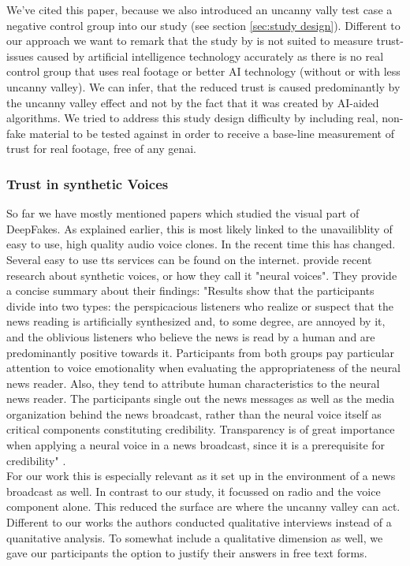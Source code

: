 \documentclass[
  a4paper,  %
  twoside,  %
  bibliography=totoc,
  headsepline,
  cleardoublepage=empty,
  parskip=half,
  draft=false
]{scrbook}
\begin{document}
We've cited this paper, because we also introduced an uncanny vally test case a negative control group into our study (see section \ref{sec:study design}). Different to our approach we want to remark that the study by  is not suited to measure trust-issues caused by artificial intelligence technology accurately as there is no real control group that uses real footage or better AI technology (without or with less uncanny valley). We can infer, that the reduced trust is caused predominantly by the uncanny valley effect and not by the fact that it was created by AI-aided algorithms. We tried to address this study design difficulty by including real, non-fake material to be tested against in order to receive a base-line measurement of trust for real footage, free of any \gls{genai}.

\subsubsection*{Trust in synthetic Voices}
So far we have mostly mentioned papers which studied the visual part of DeepFakes. As explained earlier, this is most likely linked to the unavailiblity of easy to use, high quality audio voice clones. In the recent time this has changed. Several easy to use \gls{tts} services can be found on the internet.  provide recent research about synthetic voices, or how they call it "neural voices". They provide a concise summary about their findings: "Results show that the participants divide into two types: the perspicacious listeners who realize or suspect that the news reading is artificially synthesized and, to some degree, are annoyed by it, and the oblivious listeners who believe the news is read by a human and are predominantly positive towards it. Participants from both groups pay particular attention to voice emotionality when evaluating the appropriateness of the neural news reader. Also, they tend to attribute human characteristics to the neural news reader. The participants single out the news messages as well as the media organization behind the news broadcast, rather than the neural voice itself as critical components constituting credibility. Transparency is of great importance when applying a neural voice in a news broadcast, since it is a prerequisite for credibility" \cite{heiselbergAutomatedNewsReading2022}. \\
For our work this is especially relevant as it set up in the environment of a news broadcast as well. In contrast to our study, it focussed on radio and the voice component alone. This reduced the surface are where the uncanny valley can act. Different to our works the authors conducted qualitative interviews instead of a quanitative analysis. To somewhat include a qualitative dimension as well, we gave our participants the option to justify their answers in free text forms. 
\end{document}

